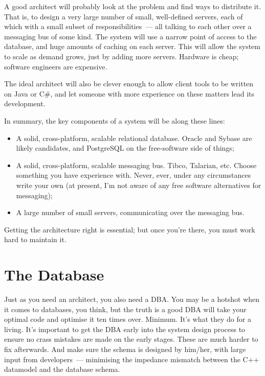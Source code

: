 \documentclass{memoir}
\begin{document}
A good architect will probably look at the problem and find ways to
distribute it. That is, to design a very large number of small,
well-defined servers, each of which with a small subset of
responsibilities~--- all talking to each other over a messaging bus of
some kind. The system will use a narrow point of access to the
database, and huge amounts of caching on each server. This will allow
the system to scale as demand grows, just by adding more
servers. Hardware is cheap; software engineers are expensive.

The ideal architect will also be clever enough to allow client tools
to be written on Java or C\#, and let someone with more experience on
these matters lead its development.

In summary, the key components of a system will be along these lines:

\begin{itemize}
\item A solid, cross-platform, scalable relational database. Oracle
  and Sybase are likely candidates, and PostgreSQL on the
  free-software side of things;
\item A solid, cross-platform, scalable messaging bus. Tibco,
  Talarian, etc. Choose something you have experience with. Never,
  ever, under any circumstances write your own (at present, I'm not
  aware of any free software alternatives for messaging);
\item A large number of small servers, communicating over the
  messaging bus.
\end{itemize}

Getting the architecture right is essential; but once you're there,
you must work hard to maintain it.

\section{The Database}

Just as you need an architect, you also need a DBA. You may be a
hotshot when it comes to databases, you think, but the truth is a good
DBA will take your optimal code and optimise it ten times
over. Minimum. It's what they do for a living. It's important to get
the DBA early into the system design process to ensure no crass
mistakes are made on the early stages. These are much harder to fix
afterwards. And make sure the schema is designed by him/her, with
large input from developers~--- minimising the impedance mismatch
between the C++ datamodel and the database schema.
\end{document}
